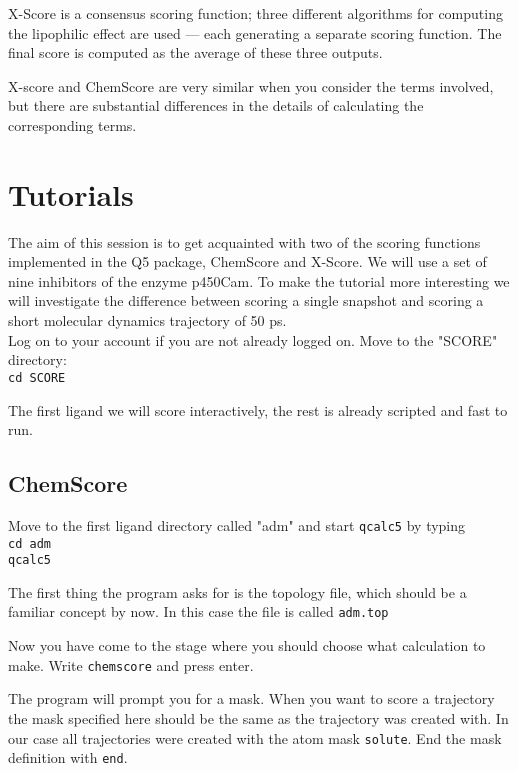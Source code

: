 \documentclass[a4paper,12pt]{article}
\newcommand{\qcalc}{\texttt{qcalc5}}
\begin{document}
X-Score is a consensus scoring function; three different
algorithms for computing the lipophilic effect are used --- each
generating a separate scoring function. The final score is
computed as the average of these three outputs.

X-score and ChemScore are very similar when you consider the terms
involved, but there are substantial differences in the details of
calculating the corresponding terms.

\section{Tutorials}

The aim of this session is to get acquainted with two of the
scoring functions implemented in the Q5 package, ChemScore and
X-Score. We will use a set of nine inhibitors of the enzyme
p450Cam. To make the tutorial more interesting we will
investigate the difference between scoring a single snapshot and
scoring a short molecular dynamics trajectory of 50 ps. \\

\noindent Log on to your account if you are not already logged on.
Move to the "SCORE" directory:\\
 \texttt{cd SCORE}

\noindent The first ligand we will score interactively, the rest
is already scripted and fast to run.

\subsection {ChemScore}

Move to the first ligand directory called "adm" and start {\qcalc}
by
typing\\
 \texttt{cd adm} \\
 \qcalc 

\noindent The first thing the program asks for is the topology
file, which should be a familiar concept by now. In this case the
file is called \texttt{adm.top}

\noindent Now you have come to the stage where you should choose
what calculation to make. Write \texttt{chemscore} and press
enter.

\noindent The program will prompt you for a mask. When you want to
score a trajectory the mask specified here should be the same as
the trajectory was created with. In our case all trajectories were
created with the atom mask \texttt{solute}. End the mask
definition with \texttt{end}.
\end{document}
